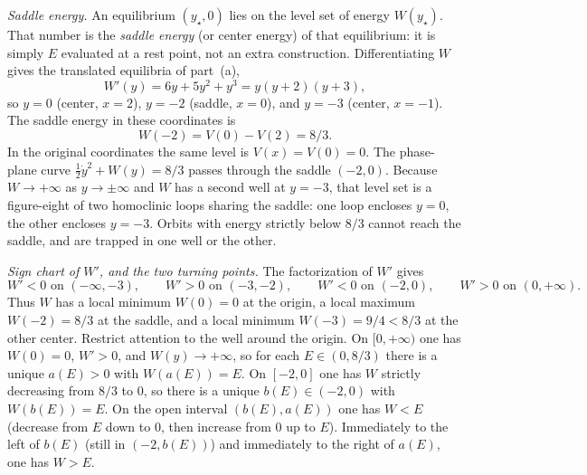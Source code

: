 \documentclass[11pt,a4paper]{article}
\begin{document}
\emph{Saddle energy.} An equilibrium \((y_{\star},0)\) lies on the level set of energy \(W(y_{\star})\). That number is the \emph{saddle energy} (or center energy) of that equilibrium: it is simply \(E\) evaluated at a rest point, not an extra construction. Differentiating \(W\) gives the translated equilibria of part~(a),
\[
W'(y)=6y+5y^{2}+y^{3}=y(y+2)(y+3),
\]
so \(y=0\) (center, \(x=2\)), \(y=-2\) (saddle, \(x=0\)), and \(y=-3\) (center, \(x=-1\)). The saddle energy in these coordinates is
\[
W(-2)=V(0)-V(2)=8/3.
\]
In the original coordinates the same level is \(V(x)=V(0)=0\). The phase-plane curve \(\frac12\dot y^{2}+W(y)=8/3\) passes through the saddle \((-2,0)\). Because \(W\to+\infty\) as \(y\to\pm\infty\) and \(W\) has a second well at \(y=-3\), that level set is a figure-eight of two homoclinic loops sharing the saddle: one loop encloses \(y=0\), the other encloses \(y=-3\). Orbits with energy strictly below \(8/3\) cannot reach the saddle, and are trapped in one well or the other.

\emph{Sign chart of \(W'\), and the two turning points.} The factorization of \(W'\) gives
\[
W'<0\text{ on }(-\infty,-3),\qquad
W'>0\text{ on }(-3,-2),\qquad
W'<0\text{ on }(-2,0),\qquad
W'>0\text{ on }(0,+\infty).
\]
Thus \(W\) has a local minimum \(W(0)=0\) at the origin, a local maximum \(W(-2)=8/3\) at the saddle, and a local minimum \(W(-3)=9/4<8/3\) at the other center. Restrict attention to the well around the origin. On \([0,+\infty)\) one has \(W(0)=0\), \(W'>0\), and \(W(y)\to+\infty\), so for each \(E\in(0,8/3)\) there is a unique \(a(E)>0\) with \(W(a(E))=E\). On \([-2,0]\) one has \(W\) strictly decreasing from \(8/3\) to \(0\), so there is a unique \(b(E)\in(-2,0)\) with \(W(b(E))=E\). On the open interval \((b(E),a(E))\) one has \(W<E\) (decrease from \(E\) down to \(0\), then increase from \(0\) up to \(E\)). Immediately to the left of \(b(E)\) (still in \((-2,b(E))\)) and immediately to the right of \(a(E)\), one has \(W>E\).
\end{document}
